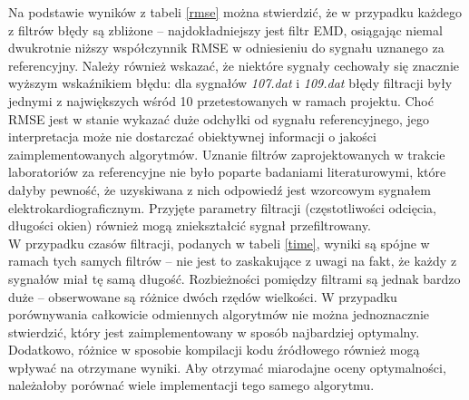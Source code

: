 \documentclass[a4paper]{article}
\begin{document}
Na podstawie wyników z tabeli \ref{rmse} można stwierdzić, że w przypadku każdego z filtrów błędy są zbliżone -- najdokładniejszy jest filtr EMD, osiągając niemal dwukrotnie niższy współczynnik RMSE w odniesieniu do sygnału uznanego za referencyjny. Należy również wskazać, że niektóre sygnały cechowały się znacznie wyższym wskaźnikiem błędu: dla sygnałów \textit{107.dat} i \textit{109.dat} błędy filtracji były jednymi z największych wśród 10 przetestowanych w ramach projektu. Choć RMSE jest w stanie wykazać duże odchyłki od sygnału referencyjnego, jego interpretacja może nie dostarczać obiektywnej informacji o jakości zaimplementowanych algorytmów. Uznanie filtrów zaprojektowanych w trakcie laboratoriów za referencyjne nie było poparte badaniami literaturowymi, które dałyby pewność, że uzyskiwana z nich odpowiedź jest wzorcowym sygnałem elektrokardiograficznym. Przyjęte parametry filtracji (częstotliwości odcięcia, długości okien) również mogą zniekształcić sygnał przefiltrowany. \\

W przypadku czasów filtracji, podanych w tabeli \ref{time}, wyniki są spójne w ramach tych samych filtrów -- nie jest to zaskakujące z uwagi na fakt, że każdy z sygnałów miał tę samą długość. Rozbieżności pomiędzy filtrami są jednak bardzo duże -- obserwowane są różnice dwóch rzędów wielkości. W przypadku porównywania całkowicie odmiennych algorytmów nie można jednoznacznie stwierdzić, który jest zaimplementowany w sposób najbardziej optymalny. Dodatkowo, różnice w sposobie kompilacji kodu źródłowego również mogą wpływać na otrzymane wyniki. Aby otrzymać miarodajne oceny optymalności, należałoby porównać wiele implementacji tego samego algorytmu.
\end{document}
